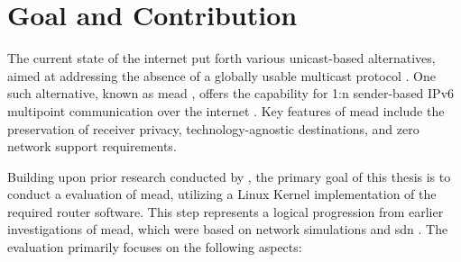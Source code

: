 

\section{Goal and Contribution} %
\label{sec:Contribution}



The current state of the internet put forth various unicast-based alternatives,
    aimed at addressing the absence of a globally usable multicast protocol
    \cite{universal_mc}.
One such alternative, known as \gls{mead} \cite{meadcast1}, offers the capability
    for 1:n sender-based IPv6 multipoint communication over the internet
    \cite{meadcast2}.
Key features of \gls{mead} include the preservation of receiver privacy,
    technology-agnostic destinations, and zero network support requirements.

Building upon prior research conducted by \citeauthor{meadcast2}
    \cite{meadcast2}, the primary goal of this thesis is to conduct a
    evaluation of \gls{mead}, utilizing a Linux Kernel implementation
    of the required router software.
This step represents a logical progression from earlier investigations of
    \gls{mead}, which were based on network simulations \cite{meadcast1} and
    \gls{sdn} \cite{sdn_ba}.
The evaluation primarily focuses on the following aspects:

